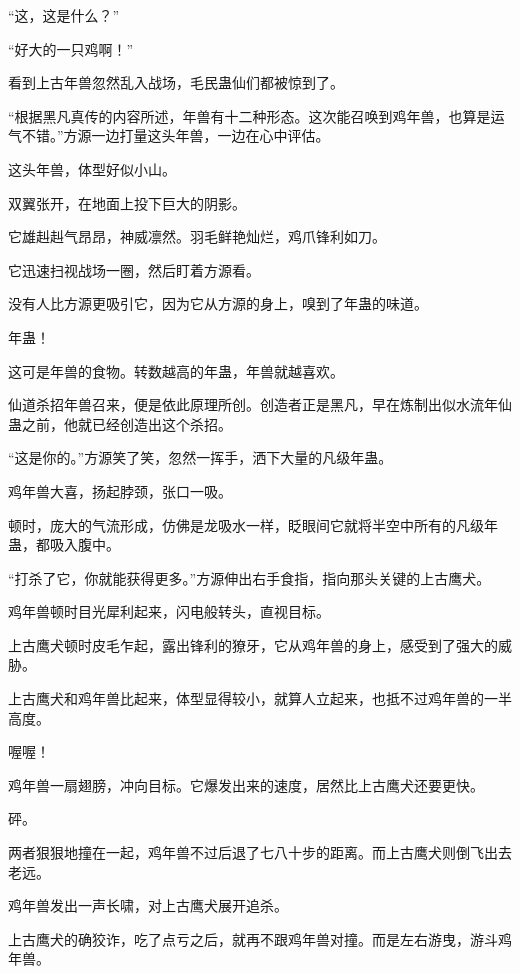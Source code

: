 
\begin{this_body}

“这，这是什么？”

“好大的一只鸡啊！”

看到上古年兽忽然乱入战场，毛民蛊仙们都被惊到了。

“根据黑凡真传的内容所述，年兽有十二种形态。这次能召唤到鸡年兽，也算是运气不错。”方源一边打量这头年兽，一边在心中评估。

这头年兽，体型好似小山。

双翼张开，在地面上投下巨大的阴影。

它雄赳赳气昂昂，神威凛然。羽毛鲜艳灿烂，鸡爪锋利如刀。

它迅速扫视战场一圈，然后盯着方源看。

没有人比方源更吸引它，因为它从方源的身上，嗅到了年蛊的味道。

年蛊！

这可是年兽的食物。转数越高的年蛊，年兽就越喜欢。

仙道杀招年兽召来，便是依此原理所创。创造者正是黑凡，早在炼制出似水流年仙蛊之前，他就已经创造出这个杀招。

“这是你的。”方源笑了笑，忽然一挥手，洒下大量的凡级年蛊。

鸡年兽大喜，扬起脖颈，张口一吸。

顿时，庞大的气流形成，仿佛是龙吸水一样，眨眼间它就将半空中所有的凡级年蛊，都吸入腹中。

“打杀了它，你就能获得更多。”方源伸出右手食指，指向那头关键的上古鹰犬。

鸡年兽顿时目光犀利起来，闪电般转头，直视目标。

上古鹰犬顿时皮毛乍起，露出锋利的獠牙，它从鸡年兽的身上，感受到了强大的威胁。

上古鹰犬和鸡年兽比起来，体型显得较小，就算人立起来，也抵不过鸡年兽的一半高度。

喔喔！

鸡年兽一扇翅膀，冲向目标。它爆发出来的速度，居然比上古鹰犬还要更快。

砰。

两者狠狠地撞在一起，鸡年兽不过后退了七八十步的距离。而上古鹰犬则倒飞出去老远。

鸡年兽发出一声长啸，对上古鹰犬展开追杀。

上古鹰犬的确狡诈，吃了点亏之后，就再不跟鸡年兽对撞。而是左右游曳，游斗鸡年兽。


\end{this_body}

